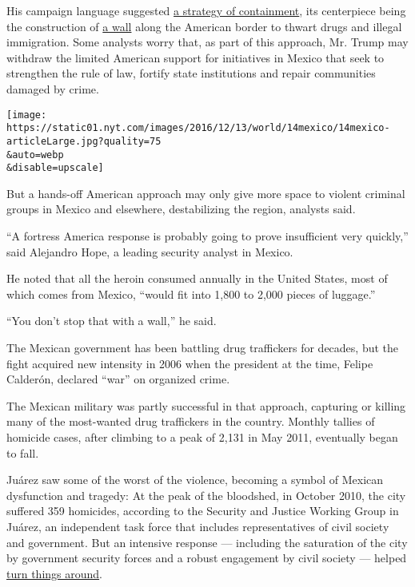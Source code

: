 His campaign language suggested
\href{https://www.nytimes.com/2016/11/15/world/americas/mexico-donald-trump-enrique-pena-nieto.html}{a
strategy of containment}, its centerpiece being the construction of
\href{https://www.nytimes.com/2016/09/02/us/us-mexico-border-wall-tunnels.html?rref=collection\%2Ftimestopic\%2FMexican\%20Drug\%20Trafficking\&action=click\&contentCollection=world\&region=stream\&module=stream_unit\&version=latest\&contentPlacement=5\&pgtype=collection}{a
wall} along the American border to thwart drugs and illegal immigration.
Some analysts worry that, as part of this approach, Mr. Trump may
withdraw the limited American support for initiatives in Mexico that
seek to strengthen the rule of law, fortify state institutions and
repair communities damaged by crime.

\texttt{[image: https://static01.nyt.com/images/2016/12/13/world/14mexico/14mexico-articleLarge.jpg?quality=75\\\&auto=webp\\\&disable=upscale]}

But a hands-off American approach may only give more space to violent
criminal groups in Mexico and elsewhere, destabilizing the region,
analysts said.

``A fortress America response is probably going to prove insufficient
very quickly,'' said Alejandro Hope, a leading security analyst in
Mexico.

He noted that all the heroin consumed annually in the United States,
most of which comes from Mexico, ``would fit into 1,800 to 2,000 pieces
of luggage.''

``You don't stop that with a wall,'' he said.

The Mexican government has been battling drug traffickers for decades,
but the fight acquired new intensity in 2006 when the president at the
time, Felipe Calderón, declared ``war'' on organized crime.

The Mexican military was partly successful in that approach, capturing
or killing many of the most-wanted drug traffickers in the country.
Monthly tallies of homicide cases, after climbing to a peak of 2,131 in
May 2011, eventually began to fall.

Juárez saw some of the worst of the violence, becoming a symbol of
Mexican dysfunction and tragedy: At the peak of the bloodshed, in
October 2010, the city suffered 359 homicides, according to the Security
and Justice Working Group in Juárez, an independent task force that
includes representatives of civil society and government. But an
intensive response --- including the saturation of the city by
government security forces and a robust engagement by civil society ---
helped
\href{http://www.nytimes.com/2013/12/15/world/americas/a-border-city-known-for-killing-gets-back-to-living.html}{turn
things around}.

